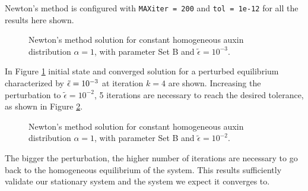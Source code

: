 Newton's method is configured with \verb|MAXiter = 200| and \verb|tol = 1e-12| for all the results here shown.
\begin{figure}[H]
    \centering
    \quad
    \caption[Validation of theoretical equilibrium - $\tilde{\epsilon} = 10^{-3}$ ]{Newton's method solution for constant homogeneous auxin distribution $\alpha = 1$, with parameter Set B and $\tilde{\epsilon} = 10^{-3}$.}
    \label{fig:Uhom_1e-3}
\end{figure}
In Figure \ref{fig:Uhom_1e-3} initial state and converged solution for a perturbed equilibrium characterized by $\Tilde{\epsilon} = 10^{-3}$ at iteration $k = 4$ are shown.
Increasing the perturbation to $\tilde{\epsilon} = 10^{-2}$, 5 iterations are necessary to reach the desired tolerance, as shown in Figure \ref{fig:Uhom_1e-2}.
\begin{figure}[h]
    \centering
    \quad
    \caption[Validation of theoretical equilibrium - $\tilde{\epsilon} = 10^{-2}$ ]{Newton's method solution for constant homogeneous auxin distribution $\alpha = 1$, with parameter Set B and $\tilde{\epsilon} = 10^{-2}$.}
    \label{fig:Uhom_1e-2}
\end{figure}
The bigger the perturbation, the higher number of iterations are necessary to go back to the homogeneous equilibrium of the system. This results sufficiently validate our stationary system and the system we expect it converges to.

